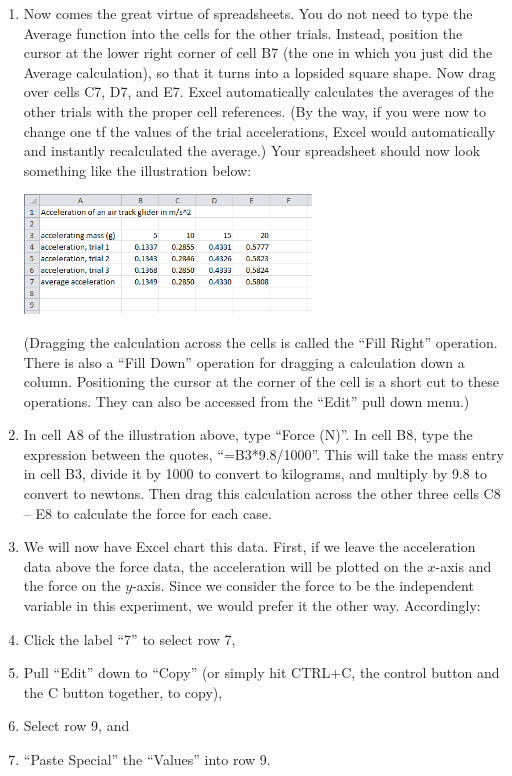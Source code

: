 \begin{enumerate}[label=\arabic*.]
\item Now comes the great virtue of spreadsheets.  You do not need to type the Average function into the cells for the other trials.  Instead, position the cursor at the lower right corner of cell B7 (the one in which you just did the Average calculation), so that it turns into a lopsided square shape.  Now drag over cells C7, D7, and E7.  Excel automatically calculates the averages of the other trials with the proper cell references.  (By the way, if you were now to change one tf the values of the trial accelerations, Excel would automatically and instantly recalculated the average.)  Your spreadsheet should now look something like the illustration below:
\begin{center} \includegraphics*[width=0.6\textwidth]{imgs/6labs/6Alab/6Aexp3/6A_exp3_Excel_Spreadsheet2.png} \end{center}
(Dragging the calculation across the cells is called the ``Fill Right'' operation.  There is also a ``Fill Down'' operation for dragging a calculation down a column.  Positioning the cursor at the corner of the cell is a short cut to these operations.  They can also be accessed from the ``Edit'' pull down menu.)

\item In cell A8 of the illustration above, type ``Force (N)''.  In cell B8, type the expression between the quotes, ``=B3*9.8/1000''.  This will take the mass entry in cell B3, divide it by 1000 to convert to kilograms, and multiply by 9.8 to convert to newtons.  Then drag this calculation across the other three cells C8 -- E8 to calculate the force for each case.

\item We will now have Excel chart this data.  First, if we leave the acceleration data above the force data, the acceleration will be plotted on the \(x\)-axis and the force on the \(y\)-axis.  Since we consider the force to be the independent variable in this experiment, we would prefer it the other way.  Accordingly:
\squishlist
\item Click the label ``7'' to select row 7,
\item Pull ``Edit'' down to ``Copy'' (or simply hit CTRL+C, the control button and the C button together, to copy),
\item Select row 9, and
\item ``Paste Special'' the ``Values'' into row 9.
\squishend


\end{enumerate}
